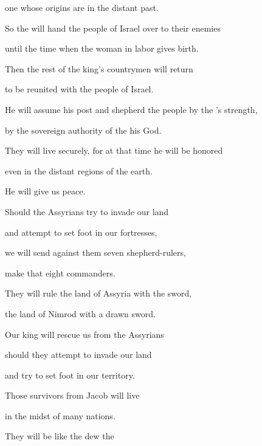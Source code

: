 {\par }{\Q one whose
origins
are in the distant past.
\par }{\Q {}So
the
{} will hand
the people of Israel over
to their enemies

\par }{\Q until
the time
when the woman in labor
gives birth.
\par }{\Q Then the rest
of the king’s countrymen
will return
\par }{\Q to be reunited
with the people of Israel.
\par }{\Q {}He will assume his post
and shepherd
the people by the
{}’s
strength,
\par }{\Q by the sovereign
authority
of the
{}
his God.
\par }{\Q They will live securely,
for
at that time
he will be honored
\par }{\Q even
in the distant regions
of the earth.
\par }{\Q {}He will give
us peace.
\par }{\Q Should the Assyrians
try to invade
our land
\par }{\Q and attempt to set foot
in our fortresses,
\par }{\Q we will send
against
them seven
shepherd-rulers,
\par }{\Q make that eight
commanders.
\par }{\Q {}They will rule
the land
of Assyria
with the sword,
\par }{\Q the land
of Nimrod
with a drawn sword.
\par }{\Q Our king will rescue
us from the Assyrians
\par }{\Q should they attempt to invade
our land
\par }{\Q and try to set foot
in our territory.
\par }{\Q {}Those survivors
from Jacob
will live

\par }{\Q in the midst
of many
nations.
\par }{\Q They will be
like the dew
the

}
